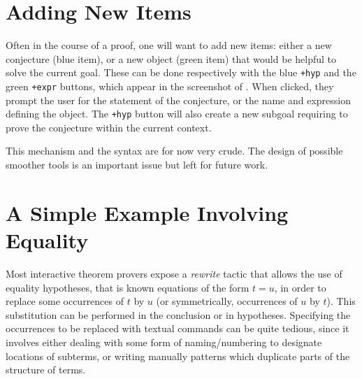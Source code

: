 \section{Adding New Items}

Often in the course of a proof, one will want to add new items: either a new
conjecture (blue item), or a new object (green item) that would be helpful to
solve the current goal. These can be done respectively with the blue
\texttt{+hyp} and the green \texttt{+expr} buttons, which appear in the
screenshot of . When clicked, they prompt the user
for the statement of the conjecture, or the name and expression defining the
object. The \texttt{+hyp} button will also create a new subgoal requiring to
prove the conjecture within the current context.

This mechanism and the syntax are for now very crude. The design of
possible smoother tools is an important issue but left for future
work.


\section{A Simple Example Involving Equality}

Most interactive theorem provers expose a \emph{rewrite} tactic that allows the
use of equality hypotheses, that is known equations of the form $t = u$, in
order to replace some occurrences of $t$ by $u$ (or symmetrically, occurrences
of $u$ by $t$). This substitution can be performed in the conclusion or in
hypotheses. Specifying the occurrences to be replaced with textual commands can
be quite tedious, since it involves either dealing with some form of
naming/numbering to designate locations of subterms, or writing manually
patterns which duplicate parts of the structure of terms.

